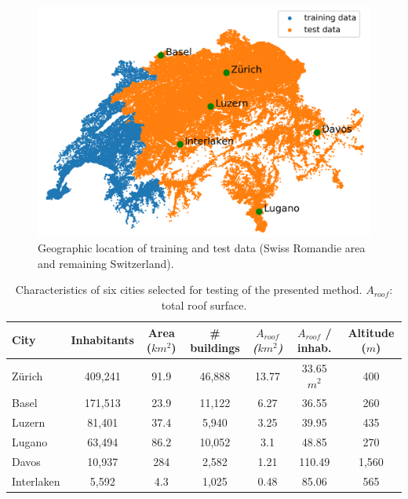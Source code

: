 \begin{figure}[tb]
\centering\includegraphics[width=0.6\linewidth]{images/Figs/train_test_w_cities.png}
\caption{Geographic location of training and test data (Swiss Romandie area and remaining Switzerland).}
\label{fig:chile_case_study}
\end{figure}

\begin{table}[tb]
\centering
\footnotesize
\caption{Characteristics of six cities selected for testing of the presented method. $A_{roof}$: total roof surface.}
\label{tab:chile_cities}
\begin{tabular}{lcccccc}
\hline
\textbf{City} & \textbf{Inhabitants} & \textbf{Area ($km^2$)} & \textbf{\# buildings} & \textit{\textbf{$A_{roof}$ ($km^2$)}} & \textbf{$A_{roof}$ / inhab.} & \textbf{Altitude ($m$)} \\ \hline
Zürich        & 409,241              & 91.9                & 46,888                & 13.77                         & 33.65 $m^2$                & 400                   \\
Basel         & 171,513              & 23.9                & 11,122                & 6.27                          & 36.55                   & 260                   \\
Luzern        & 81,401               & 37.4                & 5,940                 & 3.25                          & 39.95                   & 435                   \\
Lugano        & 63,494               & 86.2                & 10,052                & 3.1                           & 48.85                   & 270                   \\
Davos         & 10,937               & 284                 & 2,582                 & 1.21                          & 110.49                  & 1,560                 \\
Interlaken    & 5,592                & 4.3                 & 1,025                 & 0.48                          & 85.06                   & 565                   \\ \hline
\end{tabular}
\end{table}

